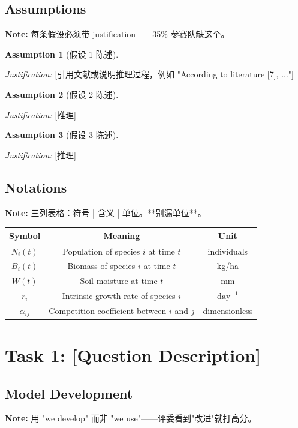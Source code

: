 \documentclass[12pt]{article}
\newtheorem{assumption}{Assumption}[section]
\begin{document}
\subsection{Assumptions}
\textbf{Note:} 每条假设必须带 justification——35\% 参赛队缺这个。

\begin{assumption}
[假设 1 陈述]
\end{assumption}
\noindent\textit{Justification:} [引用文献或说明推理过程，例如 "According to literature [7], ..."]

\begin{assumption}
[假设 2 陈述]
\end{assumption}
\noindent\textit{Justification:} [推理]

\begin{assumption}
[假设 3 陈述]
\end{assumption}
\noindent\textit{Justification:} [推理]


\subsection{Notations}
\textbf{Note:} 三列表格：符号 | 含义 | 单位。**别漏单位**。

\begin{center}
\begin{tabular}{ccc}
    \toprule
    \textbf{Symbol} & \textbf{Meaning} & \textbf{Unit} \\
    \midrule
    $N_i(t)$ & Population of species $i$ at time $t$ & individuals \\
    $B_i(t)$ & Biomass of species $i$ at time $t$ & kg/ha \\
    $W(t)$ & Soil moisture at time $t$ & mm \\
    $r_i$ & Intrinsic growth rate of species $i$ & $\mathrm{day}^{-1}$ \\
    $\alpha_{ij}$ & Competition coefficient between $i$ and $j$ & dimensionless \\
    \bottomrule
\end{tabular}
\end{center}

\section{Task 1: [Question Description]}

\subsection{Model Development}
\textbf{Note:} 用 "we develop" 而非 "we use"——评委看到"改进"就打高分。
\end{document}
